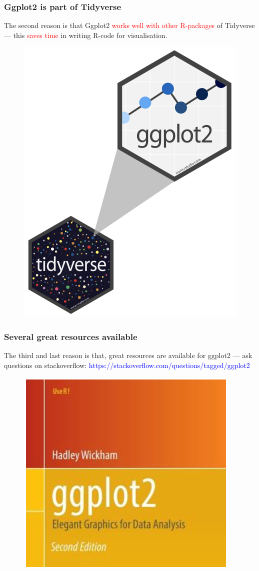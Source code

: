 \documentclass{beamer}
\begin{document}
\begin{frame}[t]\frametitle{Ggplot2 is part of Tidyverse}
\small
The second reason is that Ggplot2 \textcolor{red}{works well with other R-packages} of Tidyverse --- this \textcolor{red}{saves time} in writing R-code for visualisation.
\begin{figure}
\includegraphics[width=0.50\linewidth]{PlotsLec2/ggplot2partoftidyverse}
\end{figure}
\end{frame}

\begin{frame}\frametitle{Several great resources available}
The third and last reason is that, great resources are available for ggplot2 --- ask questions on stackoverflow:
\textcolor{blue}{https://stackoverflow.com/questions/tagged/ggplot2}
\begin{figure}
\includegraphics[width=0.60\linewidth]{PlotsLec2/ggplot2book}
\end{figure}
\end{frame}
\end{document}

